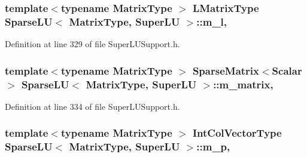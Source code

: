 \hypertarget{class_sparse_l_u_3_01_matrix_type_00_01_super_l_u_01_4_a082c53c0ea1cb1547e88f6a602b3216c}{
\subsubsection[{m\-\_\-l}]{\setlength{\rightskip}{0pt plus 5cm}template$<$typename Matrix\-Type $>$ {\bf L\-Matrix\-Type} {\bf Sparse\-L\-U}$<$ Matrix\-Type, {\bf Super\-L\-U} $>$\-::m\-\_\-l\hspace{0.3cm}{\ttfamily [mutable]}, {\ttfamily [protected]}}}\label{class_sparse_l_u_3_01_matrix_type_00_01_super_l_u_01_4_a082c53c0ea1cb1547e88f6a602b3216c}


Definition at line 329 of file Super\-L\-U\-Support.\-h.

\hypertarget{class_sparse_l_u_3_01_matrix_type_00_01_super_l_u_01_4_a85a2c468e0ae13c1c6b12c47d119ef71}{
\subsubsection[{m\-\_\-matrix}]{\setlength{\rightskip}{0pt plus 5cm}template$<$typename Matrix\-Type $>$ {\bf Sparse\-Matrix}$<${\bf Scalar}$>$ {\bf Sparse\-L\-U}$<$ Matrix\-Type, {\bf Super\-L\-U} $>$\-::m\-\_\-matrix\hspace{0.3cm}{\ttfamily [mutable]}, {\ttfamily [protected]}}}\label{class_sparse_l_u_3_01_matrix_type_00_01_super_l_u_01_4_a85a2c468e0ae13c1c6b12c47d119ef71}


Definition at line 334 of file Super\-L\-U\-Support.\-h.

\hypertarget{class_sparse_l_u_3_01_matrix_type_00_01_super_l_u_01_4_a53e9ea0364b931aec6c28fe65b82173a}{
\subsubsection[{m\-\_\-p}]{\setlength{\rightskip}{0pt plus 5cm}template$<$typename Matrix\-Type $>$ {\bf Int\-Col\-Vector\-Type} {\bf Sparse\-L\-U}$<$ Matrix\-Type, {\bf Super\-L\-U} $>$\-::m\-\_\-p\hspace{0.3cm}{\ttfamily [mutable]}, {\ttfamily [protected]}}}\label{class_sparse_l_u_3_01_matrix_type_00_01_super_l_u_01_4_a53e9ea0364b931aec6c28fe65b82173a}


